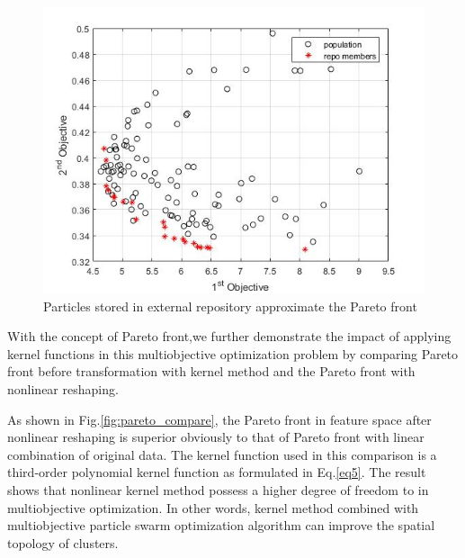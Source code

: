 \begin{figure}[t]
\centering
\includegraphics[scale=.6]{Fig/repo_members.jpg}
\caption{Particles stored in external repository approximate the Pareto front}
\label{fig:repo_members}
\end{figure}

With the concept of Pareto front,we further demonstrate the impact of applying kernel functions in this multiobjective optimization problem by comparing Pareto front before transformation with kernel method and the Pareto front with nonlinear reshaping. %


As shown in Fig.\ref{fig:pareto_compare}, the Pareto front in feature space after nonlinear reshaping is superior obviously to that of Pareto front with linear combination of original data. The kernel function used in this comparison is a third-order polynomial kernel function as formulated in Eq.\ref{eq5}. The result shows that nonlinear kernel method possess a higher degree of freedom to in multiobjective optimization. In other words, kernel method combined with multiobjective particle swarm optimization algorithm can improve the spatial topology of clusters.

